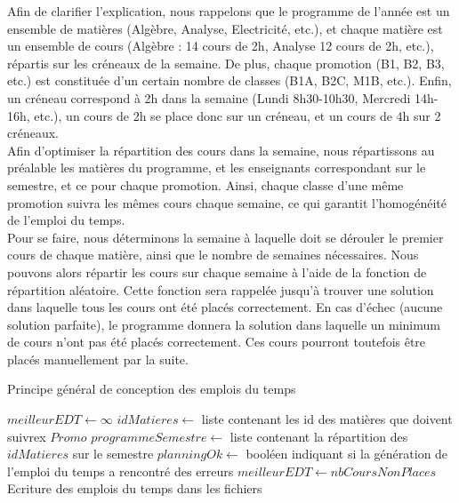 Afin de clarifier l'explication, nous rappelons que le programme de l'année est un ensemble de matières (Algèbre, Analyse, Electricité, etc.), et chaque matière est un ensemble de cours (Algèbre : 14 cours de 2h, Analyse 12 cours de 2h, etc.), répartis sur les créneaux de la semaine. De plus, chaque promotion (B1, B2, B3, etc.) est constituée d'un certain nombre de classes (B1A, B2C, M1B, etc.).
Enfin, un créneau correspond à 2h dans la semaine (Lundi 8h30-10h30, Mercredi 14h-16h, etc.), un cours de 2h se place donc sur un créneau, et un cours de 4h sur 2 créneaux.\\

Afin d'optimiser la répartition des cours dans la semaine, nous répartissons au préalable les matières du programme, et les enseignants correspondant sur le semestre, et ce pour chaque promotion. Ainsi, chaque classe d'une même promotion suivra les mêmes cours chaque semaine, ce qui garantit l'homogénéité de l'emploi du temps.\\

Pour se faire, nous déterminons la semaine à laquelle doit se dérouler le premier cours de chaque matière, ainsi que le nombre de semaines nécessaires. Nous pouvons alors répartir les cours sur chaque semaine à l'aide de la fonction de répartition aléatoire. Cette fonction sera rappelée jusqu'à trouver une solution dans laquelle tous les cours ont été placés correctement. En cas d'échec (aucune solution parfaite), le programme donnera la solution dans laquelle un minimum de cours n'ont pas été placés correctement. Ces cours pourront toutefois être placés manuellement par la suite.\\

\newpage

\begin{algorithm}
\caption{Principe général de conception des emplois du temps}
\begin{algorithmic}
\STATE $meilleurEDT \leftarrow \infty$
\REPEAT
{}
\STATE $idMatieres \leftarrow$ liste contenant les id des matières que doivent suivrex $Promo$
\STATE $programmeSemestre \leftarrow $ liste contenant la répartition des $idMatieres$ sur le semestre
\STATE $planningOk \leftarrow$ booléen indiquant si la génération de l'emploi du temps a rencontré des erreurs
\ENDFOR
{}
\STATE $meilleurEDT \leftarrow nbCoursNonPlaces$
\STATE Ecriture des emplois du temps dans les fichiers
\ENDIF
\ENDIF
{}
\end{algorithmic}
\end{algorithm}

